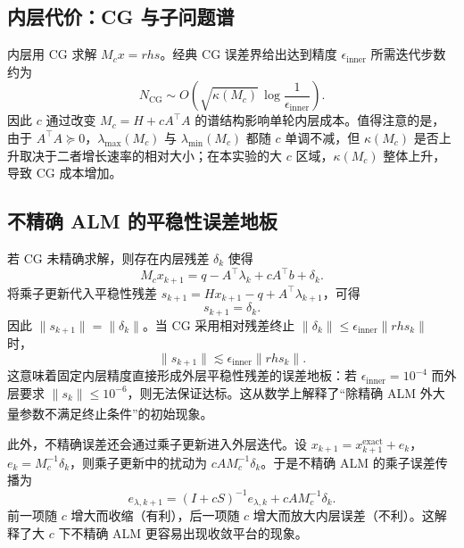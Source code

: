 \documentclass[UTF8]{ctexart}
\numberwithin{figure}{section}
\newcommand{\scite}[1]{\textsuperscript{\cite{#1}}}
\theoremstyle{definition}
\theoremstyle{examplestyle}
\theoremstyle{remark}
\begin{document}
\subsection{内层代价：CG 与子问题谱}
\label{sec:mech-inner}

内层用 CG 求解 $M_cx=rhs$。经典 CG 误差界给出达到精度 $\epsilon_{\mathrm{inner}}$ 所需迭代步数约为
\begin{equation}
\label{eq:mech-cg}
N_{\mathrm{CG}}\sim O\left(\sqrt{\kappa(M_c)}\,\log\frac1{\epsilon_{\mathrm{inner}}}\right).
\end{equation}
因此 $c$ 通过改变 $M_c=H+cA^\top A$ 的谱结构影响单轮内层成本。值得注意的是，由于 $A^\top A\succeq0$，$\lambda_{\max}(M_c)$ 与 $\lambda_{\min}(M_c)$ 都随 $c$ 单调不减，但 $\kappa(M_c)$ 是否上升取决于二者增长速率的相对大小；在本实验的大 $c$ 区域，$\kappa(M_c)$ 整体上升，导致 CG 成本增加。

\subsection{不精确 ALM 的平稳性误差地板}
\label{sec:mech-inexact}

若 CG 未精确求解，则存在内层残差 $\delta_k$ 使得
\begin{equation}
\label{eq:inner-residual}
M_cx_{k+1}=q-A^\top\lambda_k+cA^\top b+\delta_k.
\end{equation}
将乘子更新代入平稳性残差 $s_{k+1}=Hx_{k+1}-q+A^\top\lambda_{k+1}$，可得
\begin{equation}
\label{eq:stationarity-floor}
s_{k+1}=\delta_k.
\end{equation}
因此 $\|s_{k+1}\|=\|\delta_k\|$。当 CG 采用相对残差终止 $\|\delta_k\|\le\epsilon_{\mathrm{inner}}\|rhs_k\|$ 时，
\begin{equation}
\label{eq:error-floor}
\|s_{k+1}\|\lesssim\epsilon_{\mathrm{inner}}\|rhs_k\|.
\end{equation}
这意味着固定内层精度直接形成外层平稳性残差的误差地板：若 $\epsilon_{\mathrm{inner}}=10^{-4}$ 而外层要求 $\|s_k\|\le10^{-6}$，则无法保证达标。这从数学上解释了“除精确 ALM 外大量参数不满足终止条件”的初始现象\scite{fernandez2012}。

此外，不精确误差还会通过乘子更新进入外层迭代。设 $x_{k+1}=x_{k+1}^{\mathrm{exact}}+e_k$，$e_k=M_c^{-1}\delta_k$，则乘子更新中的扰动为 $cAM_c^{-1}\delta_k$。于是不精确 ALM 的乘子误差传播为
\begin{equation}
\label{eq:inexact-multiplier}
e_{\lambda,k+1}=(I+cS)^{-1}e_{\lambda,k}+cAM_c^{-1}\delta_k.
\end{equation}
前一项随 $c$ 增大而收缩（有利），后一项随 $c$ 增大而放大内层误差（不利）。这解释了大 $c$ 下不精确 ALM 更容易出现收敛平台的现象。
\end{document}
